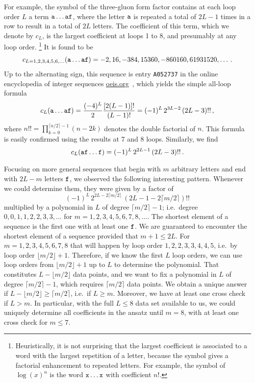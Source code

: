\documentclass[12pt]{article}
\begin{document}
For example, the symbol of the three-gluon form factor contains at each loop order $L$ a term ${\tt a\ldots af}$, where the letter ${\tt a}$ is repeated a total of $2L-1$ times in a row to result in a total of $2L$ letters.
The coefficient of this term, which we denote by $c_L$,  is the largest coefficient at loops 1 to 8, and presumably at any loop order.%
\footnote{Heuristically, it is not surprising that the largest coefficient is associated to a word with the largest repetition of a letter, because the symbol gives a factorial enhancement to repeated letters. For example, the symbol of $\log(x)^n$ is the word $\tt x\dots x$ with coefficient $n!$.} It is found to be 
%
\begin{equation}
c_{L=1,2,3,4,5,6,\dots}({\tt a\ldots af}) = -2, 16, -384, 15360, -860160, 61931520, \ldots\,.
\end{equation}
%
Up to the alternating sign, this sequence is entry \texttt{A052737} in the online encyclopedia of integer sequences \url{oeis.org}~\citep{OEISA052737}, which yields the simple all-loop formula
%
\begin{equation}
c_L({\tt a\ldots af}) = 
\frac{(-4)^L}{2} \frac{[2(L-1)]!}{(L-1)!}=
(-1)^L \, 2^{3L-2} \, (2L-3)!! \,,
\label{eq:Onebraycoeff}
\end{equation}
%
where $n!!=\prod_{k=0}^{\lceil n/2\rceil-1}(n-2k)$ denotes the double factorial of $n$.  This formula is easily confirmed using the results at 7 and 8 loops.
%
Similarly, we find  
\begin{equation}
c_L({\tt af\ldots f}) = 
(-1)^L \, 2^{2L-1} \, (2L-3)!! \,.
\label{eq:bdddd}
\end{equation}


Focusing on more general sequences that begin with $m$ arbitrary letters and end with $2L-m$ letters $\tt{f}$, we observed the following interesting pattern. Whenever we could determine them, they were given by a factor of
\begin{equation}
    (-1)^L\, 2^{2L-2\lceil{m/2}\rceil} \, (2L-1-2\lceil{m/2}\rceil)!!
\end{equation}
multiplied by a polynomial in $L$ of degree $\lceil{m/2}\rceil-1$; i.e.\ degree $0,0,1,1,2,2,3,3,\dots $ for $m=1,2,3,4,5,6,7,8,\ldots$. 
The shortest element of a sequence is the first one with at least one $\tt f$. We are guaranteed to encounter the shortest element of a sequence provided that $m+1\leq2L$. For $m=1,2,3,4,5,6,7,8$ that will happen by loop order $1,2,2,3,3,4,4,5$, i.e.~by loop order $\lfloor{m/2}\rfloor+1$. Therefore, if we know the first $L$ loop orders, we can use loop orders from $\lfloor{m/2}\rfloor+1$ up to $L$ to determine the polynomial.  That constitutes $L-\lfloor{m/2}\rfloor$ data points, and we want to fix a polynomial in $L$ of degree $\lceil{m/2}\rceil-1$, which requires $\lceil{m/2}\rceil$ data points. We obtain a unique answer if $L-\lfloor{m/2}\rfloor\geq \lceil{m/2}\rceil$, i.e.\ if $L\geq m$. Moreover, we have at least one cross check if $L>m$.
In particular, with the full $L\leq8$ data set available to us, we could uniquely determine all coefficients in the ansatz until $m=8$, with at least one cross check for $m\leq 7$.
\end{document}
